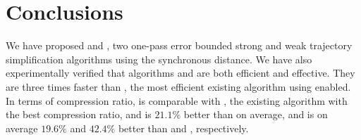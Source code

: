 \section{Conclusions} %

We have proposed \cist and \cista, two one-pass error bounded strong and weak trajectory simplification algorithms using the  synchronous distance.
We have also experimentally verified that algorithms \cist and \cista are both efficient and effective.
They are three times faster than \squishe, the most efficient existing \lsa algorithm using \sed enabled.
In terms of compression ratio, \cist is {comparable} with \dps, the existing \lsa algorithm with the best compression ratio, and is $21.1\%$ better than \squishe on average, and \cista is on average $19.6\%$ and $42.4\%$ better than \dps and \squishe, respectively.
